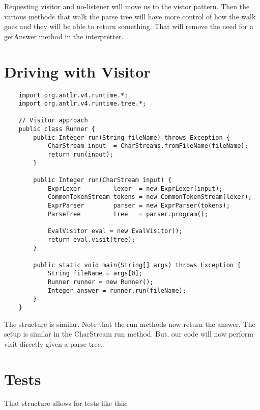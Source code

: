 Requesting visitor and no-listener will move us to the vistor pattern.
Then the various methods that walk the parse tree will have more control
of how the walk goes and they will be able to return something. That
will remove the need for a getAnswer method in the interpretter.

\section{Driving with Visitor}

{\footnotesize
\begin{verbatim}
    import org.antlr.v4.runtime.*;
    import org.antlr.v4.runtime.tree.*;
    
    // Visitor approach
    public class Runner {
        public Integer run(String fileName) throws Exception {
            CharStream input  = CharStreams.fromFileName(fileName);
            return run(input);
        }
    
        public Integer run(CharStream input) {
            ExprLexer         lexer  = new ExprLexer(input);
            CommonTokenStream tokens = new CommonTokenStream(lexer);
            ExprParser        parser = new ExprParser(tokens);
            ParseTree         tree   = parser.program();
    
            EvalVisitor eval = new EvalVisitor();
            return eval.visit(tree);
        }
    
        public static void main(String[] args) throws Exception {
            String fileName = args[0];
            Runner runner = new Runner();
            Integer answer = runner.run(fileName);
        }
    }
\end{verbatim}
}

The structure is similar. Note that the run methods now return the answer.
The setup is similar in the CharStream run method. But, our code will
now perform visit directly given a parse tree.

\section{Tests}

That structure allows for tests like this:

